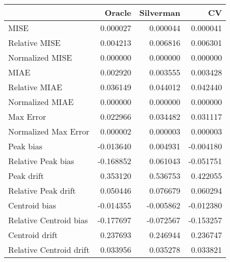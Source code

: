 \begin{tabular}{lrrr}
  \hline
 & Oracle & Silverman & CV \\ 
  \hline
MISE & 0.000027 & 0.000044 & 0.000041 \\ 
  Relative MISE & 0.004213 & 0.006816 & 0.006301 \\ 
  Normalized MISE & 0.000000 & 0.000000 & 0.000000 \\ 
  MIAE & 0.002920 & 0.003555 & 0.003428 \\ 
  Relative MIAE & 0.036149 & 0.044012 & 0.042440 \\ 
  Normalized MIAE & 0.000000 & 0.000000 & 0.000000 \\ 
  Max Error & 0.022966 & 0.034482 & 0.031117 \\ 
  Normalized Max Error & 0.000002 & 0.000003 & 0.000003 \\ 
  Peak bias & -0.013640 & 0.004931 & -0.004180 \\ 
  Relative Peak bias & -0.168852 & 0.061043 & -0.051751 \\ 
  Peak drift & 0.353120 & 0.536753 & 0.422055 \\ 
  Relative Peak drift & 0.050446 & 0.076679 & 0.060294 \\ 
  Centroid bias & -0.014355 & -0.005862 & -0.012380 \\ 
  Relative Centroid bias & -0.177697 & -0.072567 & -0.153257 \\ 
  Centroid drift & 0.237693 & 0.246944 & 0.236747 \\ 
  Relative Centroid drift & 0.033956 & 0.035278 & 0.033821 \\ 
   \hline
\end{tabular}
